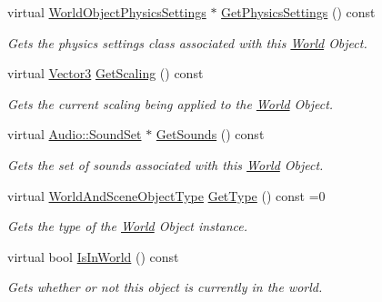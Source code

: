 \begin{DoxyCompactItemize}
virtual \hyperlink{classMezzanine_1_1WorldObjectPhysicsSettings}{WorldObjectPhysicsSettings} $\ast$ \hyperlink{classMezzanine_1_1WorldObject_ad845988a6ff31d0e7cea45d6a45bd6c1}{GetPhysicsSettings} () const 
\begin{DoxyCompactList}\small\item\em Gets the physics settings class associated with this \hyperlink{classMezzanine_1_1World}{World} Object. \item\end{DoxyCompactList}\item 
virtual \hyperlink{classMezzanine_1_1Vector3}{Vector3} \hyperlink{classMezzanine_1_1WorldObject_acfb7a99466bc0b5b5fb914983799b2b6}{GetScaling} () const 
\begin{DoxyCompactList}\small\item\em Gets the current scaling being applied to the \hyperlink{classMezzanine_1_1World}{World} Object. \item\end{DoxyCompactList}\item 
virtual \hyperlink{classMezzanine_1_1Audio_1_1SoundSet}{Audio::SoundSet} $\ast$ \hyperlink{classMezzanine_1_1WorldObject_a91408939a400205f41da74129dd82ff2}{GetSounds} () const 
\begin{DoxyCompactList}\small\item\em Gets the set of sounds associated with this \hyperlink{classMezzanine_1_1World}{World} Object. \item\end{DoxyCompactList}\item 
virtual \hyperlink{namespaceMezzanine_ae8cd04f706f4998be62f454b7119c718}{WorldAndSceneObjectType} \hyperlink{classMezzanine_1_1WorldObject_aaa860c068e93d09175f9cc187ced17e6}{GetType} () const =0
\begin{DoxyCompactList}\small\item\em Gets the type of the \hyperlink{classMezzanine_1_1World}{World} Object instance. \item\end{DoxyCompactList}\item 
virtual bool \hyperlink{classMezzanine_1_1WorldObject_a2e773e73a7a190ad56d2afedeeeb8e87}{IsInWorld} () const 
\begin{DoxyCompactList}\small\item\em Gets whether or not this object is currently in the world. \item\end{DoxyCompactList}\item 

\end{DoxyCompactItemize}
